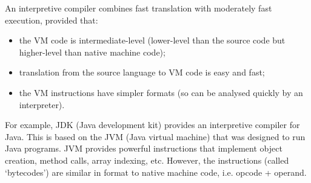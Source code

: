 \documentclass[a4paper, openany]{memoir}
\begin{document}
An interpretive compiler combines fast translation with moderately fast execution, provided that:
\begin{itemize}
    \item the VM code is intermediate-level (lower-level than the source code but higher-level than native machine code);
    \item translation from the source language to VM code is easy and fast;
    \item the VM instructions have simpler formats (so can be analysed quickly by an interpreter).
\end{itemize}

For example, JDK (Java development kit) provides an interpretive compiler for Java. This is based on the JVM (Java virtual machine) that was designed to run Java programs. JVM provides powerful instructions that implement object creation, method calls, array indexing, etc. However, the instructions (called `bytecodes') are similar in format to native machine code, i.e. opcode + operand.
\end{document}
